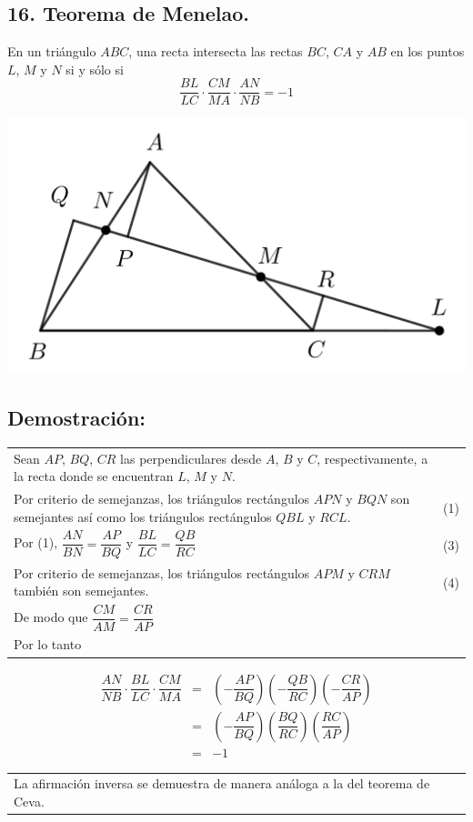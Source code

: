 \documentclass[12pt,a4paper]{article}
\begin{document}
\subsection*{16. Teorema de Menelao.}
En un triángulo $ABC$, una recta intersecta las rectas $BC$, $CA$ y $AB$ en los puntos $L$, $M$ y $N$ si y sólo si
$$\dfrac{BL}{LC}\cdot\dfrac{CM}{MA}\cdot\dfrac{AN}{NB}=-1$$
\begin{center}
\includegraphics[scale=0.7]{Imagenes/Menelao1.png} 
\end{center}
\subsection*{Demostración:}
\begin{tabular}{p{15.9 cm} p{1cm}}
Sean $AP$, $BQ$, $CR$ las perpendiculares desde $A$, $B$ y $C$, respectivamente, a la recta donde se encuentran $L$, $M$ y $N$.
\\Por criterio de semejanzas, los triángulos rectángulos $APN$ y $BQN$ son semejantes así como los triángulos rectángulos $QBL$ y $RCL$. &(1)
\\Por (1), $\dfrac{AN}{BN}=\dfrac{AP}{BQ}$ y $\dfrac{BL}{LC}=\dfrac{QB}{RC}$ &(3)
\\Por criterio de semejanzas, los triángulos rectángulos $APM$ y $CRM$ también son semejantes.&(4)
\\ De modo que $\dfrac{CM}{AM}=\dfrac{CR}{AP}$
\\Por lo tanto
\end{tabular}
\begin{eqnarray*}
\dfrac{AN}{NB}\cdot \dfrac{BL}{LC}\cdot \dfrac{CM}{MA} &=& \left( - \dfrac{AP}{BQ}\right)  \left( -  \dfrac{QB}{RC} \right) \left( - \dfrac{CR}{AP}\right)
\\&=& \left(- \dfrac{AP}{BQ}\right) \left( \dfrac{BQ}{RC}\right) \left(\dfrac{RC}{AP} \right)
\\&=& -1
\end{eqnarray*}
\begin{tabular}{p{15.9 cm} p{1cm}}
La afirmación inversa se demuestra de manera análoga a la del teorema de Ceva.
\end{tabular}
\end{document}
